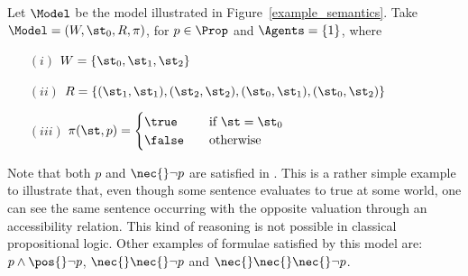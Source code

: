 \begin{example}
    Let $\Model$ be the model illustrated in Figure~\ref{example_semantics}. Take
    $\Model = (W, \st_0, R, \pi)$, for $p \in \Prop$ and $\Agents = \{1\}$,
    where 
    \begin{enumerate}
        \item[$(i)$] $W = \{\st_0, \st_1, \st_2\}$
        \item[$(ii)$] $R = \{(\st_1, \st_1), (\st_2, \st_2),
            (\st_0, \st_1), (\st_0, \st_2)\}$
        \item[$(iii)$] $ \pi(\st, p) = 
            \begin{cases} 
                \true    & \quad \text{if } \st = \st_0\\
                \false   & \quad \text{otherwise}
            \end{cases}
                       $
    \end{enumerate}

    Note that both $p$ and $\nec{} \neg p$ are satisfied in \Model. This is a
    rather simple example to illustrate that, even though some sentence
    evaluates to true at some world, one can see the same sentence
    occurring with the opposite valuation through an accessibility relation.
    This kind of reasoning is not possible in classical propositional logic.
    Other examples of formulae satisfied by this model are: $p \land \pos{} \neg
    p$, $\nec{}\nec{} \neg p$ and $\nec{} \nec {} \nec{} \neg p$.
\end{example}



